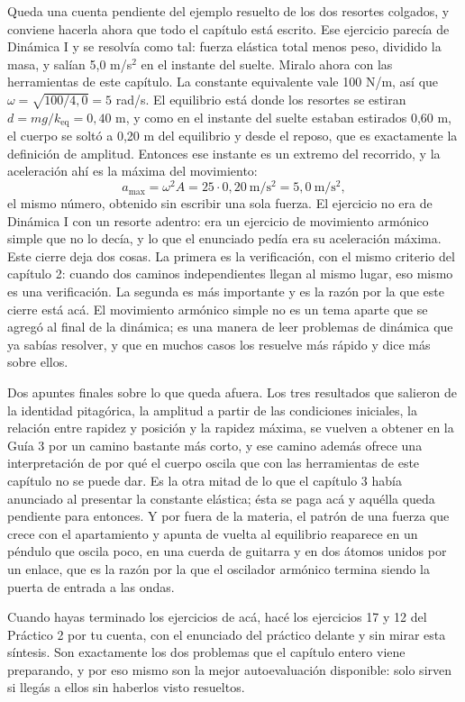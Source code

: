 \documentclass[11pt,openany]{book}
\begin{document}
Queda una cuenta pendiente del ejemplo resuelto de los dos resortes colgados, y conviene hacerla ahora que todo el capítulo está escrito. Ese ejercicio parecía de Dinámica I y se resolvía como tal: fuerza elástica total menos peso, dividido la masa, y salían 5,0 m/s$^2$ en el instante del suelte. Miralo ahora con las herramientas de este capítulo. La constante equivalente vale 100 N/m, así que $\omega = \sqrt{100/4{,}0} = 5$ rad/s. El equilibrio está donde los resortes se estiran $d = mg/k_{\text{eq}} = 0{,}40$ m, y como en el instante del suelte estaban estirados 0,60 m, el cuerpo se soltó a 0,20 m del equilibrio y desde el reposo, que es exactamente la definición de amplitud. Entonces ese instante es un extremo del recorrido, y la aceleración ahí es la máxima del movimiento:
\[
a_{\max} = \omega^{2} A = 25 \cdot 0{,}20\ \mathrm{m/s^2} = 5{,}0\ \mathrm{m/s^2} ,
\]
el mismo número, obtenido sin escribir una sola fuerza. El ejercicio no era de Dinámica I con un resorte adentro: era un ejercicio de movimiento armónico simple que no lo decía, y lo que el enunciado pedía era su aceleración máxima. Este cierre deja dos cosas. La primera es la verificación, con el mismo criterio del capítulo 2: cuando dos caminos independientes llegan al mismo lugar, eso mismo es una verificación. La segunda es más importante y es la razón por la que este cierre está acá. El movimiento armónico simple no es un tema aparte que se agregó al final de la dinámica; es una manera de leer problemas de dinámica que ya sabías resolver, y que en muchos casos los resuelve más rápido y dice más sobre ellos.

Dos apuntes finales sobre lo que queda afuera. Los tres resultados que salieron de la identidad pitagórica, la amplitud a partir de las condiciones iniciales, la relación entre rapidez y posición y la rapidez máxima, se vuelven a obtener en la Guía 3 por un camino bastante más corto, y ese camino además ofrece una interpretación de por qué el cuerpo oscila que con las herramientas de este capítulo no se puede dar. Es la otra mitad de lo que el capítulo 3 había anunciado al presentar la constante elástica; ésta se paga acá y aquélla queda pendiente para entonces. Y por fuera de la materia, el patrón de una fuerza que crece con el apartamiento y apunta de vuelta al equilibrio reaparece en un péndulo que oscila poco, en una cuerda de guitarra y en dos átomos unidos por un enlace, que es la razón por la que el oscilador armónico termina siendo la puerta de entrada a las ondas.

Cuando hayas terminado los ejercicios de acá, hacé los ejercicios 17 y 12 del Práctico 2 por tu cuenta, con el enunciado del práctico delante y sin mirar esta síntesis. Son exactamente los dos problemas que el capítulo entero viene preparando, y por eso mismo son la mejor autoevaluación disponible: solo sirven si llegás a ellos sin haberlos visto resueltos.
\end{document}
